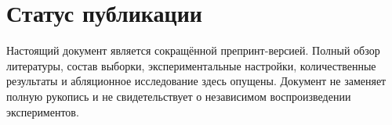 \documentclass[eqsecnum, authorsinfo]{kioj6}
\begin{document}
\pagebreak

\section{Статус публикации}
Настоящий документ является сокращённой препринт-версией. Полный обзор литературы, состав выборки, экспериментальные настройки, количественные результаты и абляционное исследование здесь опущены. Документ не заменяет полную рукопись и не свидетельствует о независимом воспроизведении экспериментов.

\printauthorsinfo
\begin{translatedpart}
\maketranslatedtitle
\begin{abstract}
This work investigates brain MRI classification under limited computational resources and a small labeled dataset. The proposed approach combines Multilinear Principal Component Analysis (MPCA), pretrained two-dimensional convolutional networks, and multi-head attention. Three-dimensional MRI tensors are transformed into three-channel representations of orthogonal anatomical planes. Independent CNN branches extract features from each projection, and a late-fusion module combines information across planes for classification. This short preprint presents the method and its software implementation. Detailed experimental protocols and numerical results are omitted from this version.
\end{abstract}
\end{translatedpart}
\end{document}
